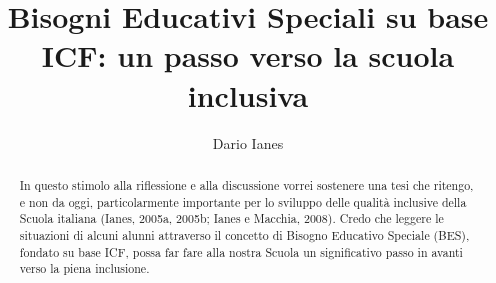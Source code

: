 \author{Dario Ianes}
\title{Bisogni Educativi Speciali su base ICF: un passo verso la scuola inclusiva}
\label{cha:scataglini170613}
\begin{abstract}
In questo stimolo alla riflessione e alla discussione vorrei sostenere una tesi che ritengo, e non
da oggi, particolarmente importante per lo sviluppo delle qualità inclusive della Scuola italiana
(Ianes, 2005a, 2005b; Ianes e Macchia, 2008). Credo che leggere le situazioni di alcuni alunni
attraverso il concetto di Bisogno Educativo Speciale (BES), fondato su base ICF, possa far fare alla
nostra Scuola un significativo passo in avanti verso la piena inclusione.
\end{abstract}
\maketitle
{}
